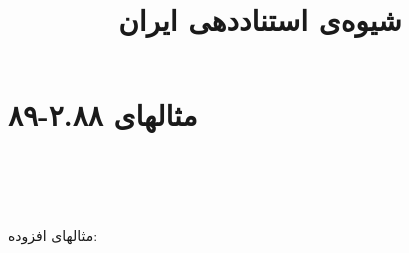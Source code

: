 \documentclass[a4paper,10pt]{article}
\begin{document}
\title{شیوه‌ی استناددهی ایران}
\author{}
\date{}
\maketitle



\section*{مثالهای ۲.۸۸-۸۹}

\cite{میرکمالی1378}\\
\\
\cite{افشارمهاجر1379}\\


مثالهای افزوده:\\
\cite{اندرسن1989}\\
\cite{شریفی1380پاسخ}\\
\\
\\






\end{document}
